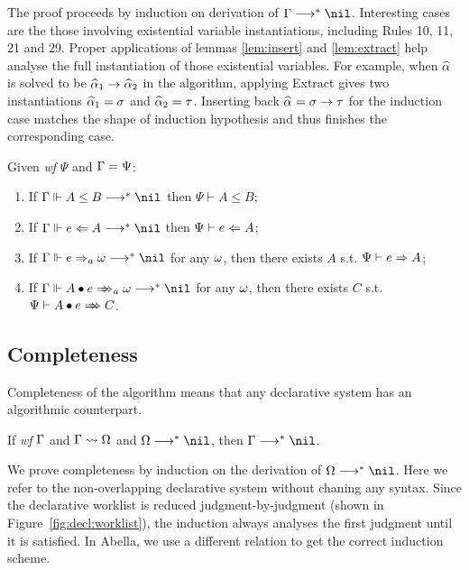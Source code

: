 The proof proceeds by induction on derivation of $\Gm\redto\nil$.
Interesting cases are the those involving existential variable instantiations,
including Rules 10, 11, 21 and 29.
Proper applications of lemmas \ref{lem:insert} and \ref{lem:extract}
help analyse the full instantiation of those existential variables.
For example, when $\al$ is solved to be $\al[1] \to \al[2]$ in the algorithm,
applying Extract gives two instantiations $\al[1] = \sigma$ and $\al[2] = \tau$.
Inserting back $\al = \sigma \to \tau$ for the induction case
matches the shape of induction hypothesis and thus finishes the corresponding case.


\begin{corollary}
Given \emph{wf }$\Psi$ and $\Gamma = \Psi$:
\begin{enumerate}
    \item If $\Gm \Vdash A \le B \redto \nil$ then $\Psi \vdash A \le B$;
    \item If $\Gm \Vdash e \Lto A \redto \nil$ then $\Psi \vdash e \Leftarrow A$;
    \item If $\Gm \Vdash e \To_a \jg \redto \nil$ for any $\omega$, then there exists $A$
        s.t. $\Psi \vdash e \Rightarrow A$;
    \item If $\Gm \Vdash \appInfAlg{A}{e} \redto \nil$ for any $\omega$, then there exists $C$
        s.t. $\Psi \vdash \appInf{A}{e}{C}$.
\end{enumerate}
\end{corollary}

\subsection{Completeness}

Completeness of the algorithm means that any declarative system has an algorithmic counterpart.

\begin{theorem}[Completeness]
If \emph{wf }$\Gamma$ and $\Gamma\rightsquigarrow\Omega$ and $\Om\redto\nil$, then $\Gm \redto \nil$.
\label{thm:completeness}
\end{theorem}

We prove completeness by induction on the derivation of $\Om\redto\nil$.
Here we refer to the non-overlapping declarative system without chaning any syntax.
Since the declarative worklist is reduced judgment-by-judgment
(shown in Figure~\ref{fig:decl:worklist}),
the induction always analyses the first judgment until it is satisfied.
In Abella, we use a different relation to get the correct induction scheme.

